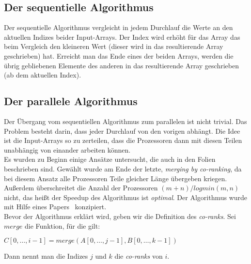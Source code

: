 \subsection{Der sequentielle Algorithmus}
Der sequentielle Algorithmus vergleicht in jedem Durchlauf die Werte an den aktuellen Indizes beider Input-Arrays. Der Index wird erhöht für das Array das beim Vergleich den kleineren Wert (dieser wird in das resultierende Array geschrieben) hat. Erreicht man das Ende eines der beiden Arrays, werden die übrig gebliebenen Elemente des anderen in das resultierende Array geschrieben (ab dem aktuellen Index).

\subsection{Der parallele Algorithmus}
Der Übergang vom sequentiellen Algorithmus zum parallelen ist nicht trivial. Das Problem besteht darin, dass jeder Durchlauf von den vorigen abhängt. Die Idee ist die Input-Arrays so zu zerteilen, dass die Prozessoren dann mit diesen Teilen unabhängig von einander arbeiten können.\\
Es wurden zu Beginn einige Ansätze untersucht, die auch in den Folien beschrieben sind. Gewählt wurde am Ende der letzte,  \emph{merging by co-ranking}, da bei diesem Ansatz alle Prozessoren Teile gleicher Länge übergeben kriegen. Außerdem überschreitet die Anzahl der Prozessoren $(m+n) / log min(m,n)$ nicht, das heißt der Speedup des Algorithmus ist \emph{optimal}. Der Algorithmus wurde mit Hilfe eines Papers~\cite{corank} konzipiert.\\
Bevor der Algorithmus erklärt wird, geben wir die Definition des \emph{co-ranks}. Sei $merge$ die Funktion, für die gilt:
\begin{center}
$C[0,\dots,i-1] = merge(A[0,\dots,j-1], B[0,\dots,k-1])$
\end{center}
Dann nennt man die Indizes $j$ und $k$ die \emph{co-ranks} von $i$.